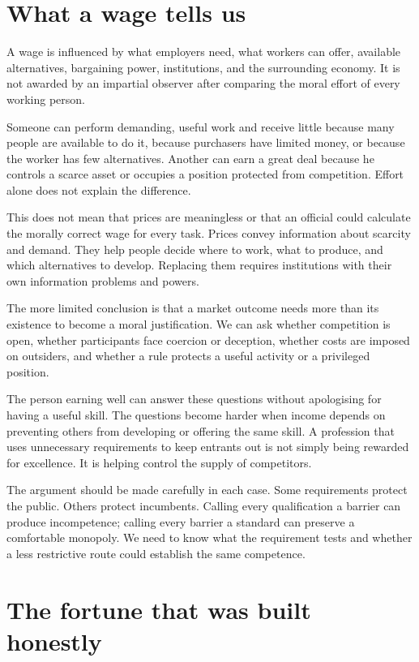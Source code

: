 \documentclass[12pt,a4paper]{book}
\begin{document}
\section*{What a wage tells us}

A wage is influenced by what employers need, what workers can offer, available alternatives, bargaining power, institutions, and the surrounding economy. It is not awarded by an impartial observer after comparing the moral effort of every working person.

Someone can perform demanding, useful work and receive little because many people are available to do it, because purchasers have limited money, or because the worker has few alternatives. Another can earn a great deal because he controls a scarce asset or occupies a position protected from competition. Effort alone does not explain the difference.

This does not mean that prices are meaningless or that an official could calculate the morally correct wage for every task. Prices convey information about scarcity and demand. They help people decide where to work, what to produce, and which alternatives to develop. Replacing them requires institutions with their own information problems and powers.

The more limited conclusion is that a market outcome needs more than its existence to become a moral justification. We can ask whether competition is open, whether participants face coercion or deception, whether costs are imposed on outsiders, and whether a rule protects a useful activity or a privileged position.

The person earning well can answer these questions without apologising for having a useful skill. The questions become harder when income depends on preventing others from developing or offering the same skill. A profession that uses unnecessary requirements to keep entrants out is not simply being rewarded for excellence. It is helping control the supply of competitors.

The argument should be made carefully in each case. Some requirements protect the public. Others protect incumbents. Calling every qualification a barrier can produce incompetence; calling every barrier a standard can preserve a comfortable monopoly. We need to know what the requirement tests and whether a less restrictive route could establish the same competence.

\section*{The fortune that was built honestly}
\end{document}
